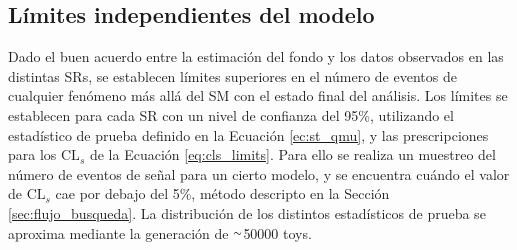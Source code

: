 \begin{table}[!ht]
\begin{tabular}{lccc}
      \hline
      \hline
    \end{tabular}
\label{tab:syst_rel_impact}
\end{table}




\subsection{Límites independientes del modelo}


Dado el buen acuerdo entre la estimación del fondo y los datos observados en las distintas SRs, se establecen límites superiores en el número de eventos de cualquier fenómeno más allá del SM con el estado final del análisis. Los límites se establecen para cada SR con un nivel de confianza del 95\%, utilizando el estadístico de prueba definido en la Ecuación \ref{ec:st_qmu}, y las prescripciones para los $\text{CL}_{s}$ de la Ecuación \ref{eq:cls_limits}. Para ello se realiza un muestreo del número de eventos de señal para un cierto modelo, y se encuentra cuándo el valor de $\text{CL}_{s}$ cae por debajo del 5\%, método descripto en la Sección \ref{sec:flujo_busqueda}. La distribución de los distintos estadísticos de prueba se aproxima mediante la generación de {$\smallsim$}50000 toys.

